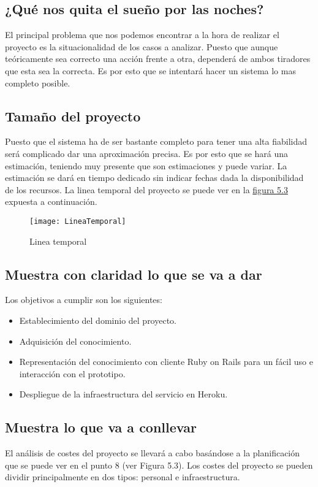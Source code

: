 \subsection{¿Qué nos quita el sueño por las noches?}
El principal problema que nos podemos encontrar a la hora de realizar el proyecto
es la situacionalidad de los casos a analizar. Puesto que aunque teóricamente
sea correcto una acción frente a otra, dependerá de ambos tiradores que esta
sea la correcta. Es por esto que se intentará hacer un sistema lo mas completo posible.

\subsection{Tamaño del proyecto}
Puesto que el sistema ha de ser bastante completo para tener una alta fiabilidad
será complicado dar una aproximación precisa. Es por esto que se hará una estimación,
teniendo muy presente que son estimaciones y puede variar. La estimación se dará en
tiempo dedicado sin indicar fechas dada la disponibilidad de los recursos. La linea
temporal del proyecto se puede ver en la \hyperref[fig:Linea temporal]{figura 5.3} expuesta a continuación.

\begin{figure}[htb]
  \centering
    \texttt{[image: LineaTemporal]}
  \caption[Linea temporal]{Linea temporal}
  \label{fig:Linea temporal}
\end{figure}

\subsection{Muestra con claridad lo que se va a dar}
Los objetivos a cumplir son los siguientes:

\begin{itemize}
  \item Establecimiento del dominio del proyecto.
  \item Adquisición del conocimiento.
  \item Representación del conocimiento con cliente Ruby on Rails para
    un fácil uso e interacción con el prototipo.
  \item Despliegue de la infraestructura del servicio en Heroku.
\end{itemize}

\subsection{Muestra lo que va a conllevar}
El análisis de costes del proyecto se llevará a cabo basándose a la planificación que se
puede ver en el punto 8 (ver Figura 5.3).
Los costes del proyecto se pueden dividir principalmente en dos tipos: personal e infraestructura.

